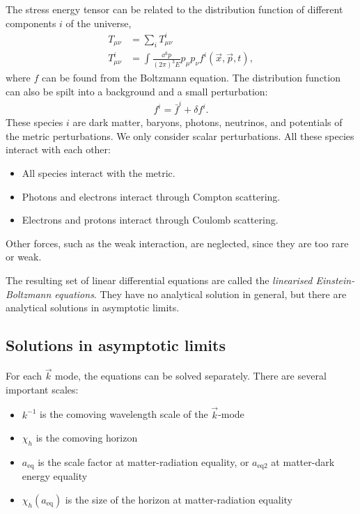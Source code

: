 The stress energy tensor can be related to the distribution function of different components $i$ of the universe,
\begin{align*}
	T_{\mu\nu} &= \sum_{i} T^{i}_{\mu\nu}\\
	T^{i}_{\mu\nu} &= \int \frac{\dd{^3p}}{(2\pi)^3 E} p_\mu p_\nu f^i(\vec{x},\vec{p},t),
\end{align*}
where $f$ can be found from the Boltzmann equation. The distribution function can also be spilt into a background and a small perturbation:
\begin{align*}
	f^i = \bar{f}^i + \delta f^i.
\end{align*}
These species $i$ are dark matter, baryons, photons, neutrinos, and potentials of the metric perturbations. We only consider scalar perturbations. All these species interact with each other:
\begin{itemize}
	\item All species interact with the metric.
	\item Photons and electrons interact through Compton scattering.
	\item Electrons and protons interact through Coulomb scattering.
\end{itemize}
Other forces, such as the weak interaction, are neglected, since they are too rare or weak.

The resulting set of linear differential equations are called the \emph{linearised Einstein-Boltzmann equations}. They have no analytical solution in general, but there are analytical solutions in asymptotic limits.

\subsection*{Solutions in asymptotic limits}
For each $\vec{k}$ mode, the equations can be solved separately. There are several important scales:
\begin{itemize}
	\item $k^{-1}$ is the comoving wavelength scale of the $\vec{k}$-mode
	\item $\chi_h$ is the comoving horizon
	\item $a_\text{eq}$ is the scale factor at matter-radiation equality, or $a_{\text{eq2}}$ at matter-dark energy equality
	\item $\chi_h(a_\text{eq})$ is the size of the horizon at matter-radiation equality
\end{itemize}

